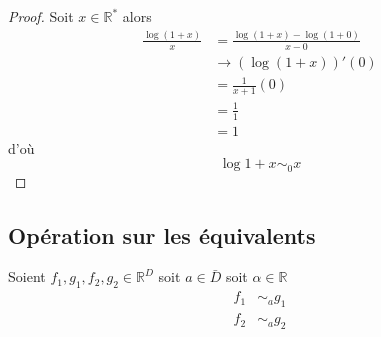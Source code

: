 \documentclass[11pt,colorlinks]{book}
\theoremstyle{mytheoremstyle}
\theoremstyle{mytheoremstyle}
\theoremstyle{mytheoremstyle}
\theoremstyle{mytheoremstyle}
\theoremstyle{mytheoremstyle}
\theoremstyle{mytheoremstyle}
\theoremstyle{mytheoremstyle}
\theoremstyle{mytheoremstyle}
\theoremstyle{myproblemstyle}
\def\mbb#1{\mathbb{#1}}
\def\bR{\mbb{R}}
\renewcommand{\equiv}{\sim}
\begin{document}
\begin{ex}
\begin{proof}
          Soit $x \in \bR^*$ alors 
          \begin{align*}
            \frac{\log(1+x)}{x} &= \frac{\log(1+x) - \log(1+0)}{x - 0} \\ 
            &\to (\log(1+x))'(0) \\ 
            &= \frac{1}{x+1}(0) \\ 
            &= \frac{1}{1} \\ 
            &= 1
          \end{align*}
          d'où 
          \begin{equation*}
            \log 1+x \sim_0 x
          \end{equation*}
      \end{proof}
    \end{ex}
    \subsection{Opération sur les équivalents}
    Soient $f_1,g_1,f_2,g_2 \in \bR^D$ soit $a \in \bar{D}$ soit $\alpha \in \bR$ 
    \begin{align*}
      f_1 &\equiv_{a} g_1 \\ 
      f_2 &\equiv_{a} g_2 \\
    \end{align*}
\end{document}
